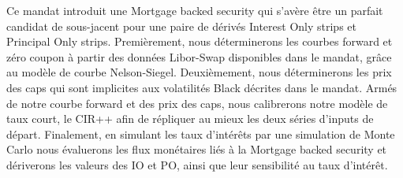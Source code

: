 Ce mandat introduit une Mortgage backed security qui s'avère être un parfait candidat de
sous-jacent pour une paire de dérivés Interest Only strips et Principal Only
strips. Premièrement, nous déterminerons les courbes forward et zéro coupon à partir des
données Libor-Swap disponibles dans le mandat, grâce au modèle de courbe
Nelson-Siegel. Deuxièmement, nous déterminerons les prix des caps qui sont implicites aux
volatilités Black décrites dans le mandat. Armés de notre courbe forward et des prix des
caps, nous calibrerons notre modèle de taux court, le CIR++ afin de répliquer au mieux les
deux séries d'inputs de départ. Finalement, en simulant les taux d'intérêts par une
simulation de Monte Carlo nous évaluerons les flux monétaires liés à la Mortgage backed
security et dériverons les valeurs des IO et PO, ainsi que leur sensibilité au taux
d'intérêt.
